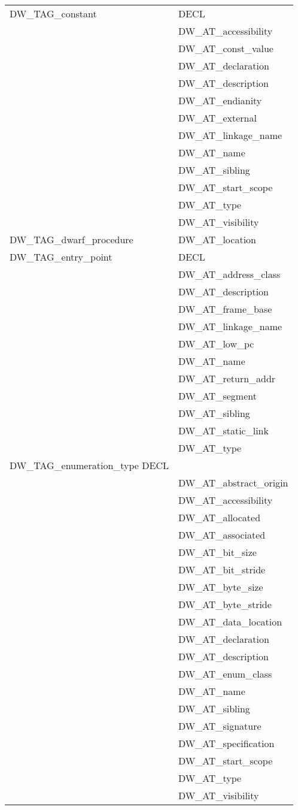 \begin{longtable}{l|p{8cm}}
DW\_TAG\_constant
&DECL \\
&DW\_AT\_accessibility \\
&DW\_AT\_const\_value \\
&DW\_AT\_declaration \\
&DW\_AT\_description \\
&DW\_AT\_endianity \\
&DW\_AT\_external \\
&DW\_AT\_linkage\_name \\
&DW\_AT\_name \\
&DW\_AT\_sibling \\
&DW\_AT\_start\_scope \\
&DW\_AT\_type \\
&DW\_AT\_visibility \\

DW\_TAG\_dwarf\_procedure
&DW\_AT\_location \\

DW\_TAG\_entry\_point
&DECL \\
&DW\_AT\_address\_class \\
&DW\_AT\_description \\
&DW\_AT\_frame\_base \\
&DW\_AT\_linkage\_name \\
&DW\_AT\_low\_pc \\
&DW\_AT\_name \\
&DW\_AT\_return\_addr \\
&DW\_AT\_segment \\
&DW\_AT\_sibling \\
&DW\_AT\_static\_link \\
&DW\_AT\_type \\


DW\_TAG\_enumeration\_type
DECL \\
&DW\_AT\_abstract\_origin \\
&DW\_AT\_accessibility \\
&DW\_AT\_allocated \\
&DW\_AT\_associated \\
&DW\_AT\_bit\_size \\
&DW\_AT\_bit\_stride \\
&DW\_AT\_byte\_size \\
&DW\_AT\_byte\_stride \\
&DW\_AT\_data\_location \\
&DW\_AT\_declaration \\
&DW\_AT\_description \\
&DW\_AT\_enum\_class \\
&DW\_AT\_name \\
&DW\_AT\_sibling \\
&DW\_AT\_signature \\
&DW\_AT\_specification \\
&DW\_AT\_start\_scope \\
&DW\_AT\_type \\
&DW\_AT\_visibility \\


\end{longtable}
